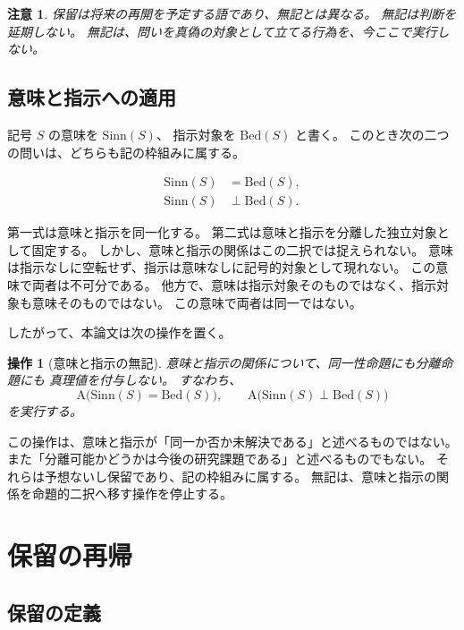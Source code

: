 \documentclass[11pt,a4paper,ja=standard,lualatex]{bxjsarticle}
\newtheorem{remark}{注意}
\newtheorem{operation}{操作}
\begin{document}
\begin{remark}
保留は将来の再開を予定する語であり、無記とは異なる。
無記は判断を延期しない。
無記は、問いを真偽の対象として立てる行為を、今ここで実行しない。
\end{remark}

\subsection{意味と指示への適用}

記号 $S$ の意味を $\mathrm{Sinn}(S)$、
指示対象を $\mathrm{Bed}(S)$ と書く。
このとき次の二つの問いは、どちらも記の枠組みに属する。

\begin{align}
\mathrm{Sinn}(S) &= \mathrm{Bed}(S),\\
\mathrm{Sinn}(S) &\perp \mathrm{Bed}(S).
\end{align}

第一式は意味と指示を同一化する。
第二式は意味と指示を分離した独立対象として固定する。
しかし、意味と指示の関係はこの二択では捉えられない。
意味は指示なしに空転せず、指示は意味なしに記号的対象として現れない。
この意味で両者は不可分である。
他方で、意味は指示対象そのものではなく、指示対象も意味そのものではない。
この意味で両者は同一ではない。

したがって、本論文は次の操作を置く。

\begin{operation}[意味と指示の無記]
意味と指示の関係について、同一性命題にも分離命題にも
真理値を付与しない。
すなわち、
\begin{equation}
\mathrm{A}\bigl(\mathrm{Sinn}(S)=\mathrm{Bed}(S)\bigr),
\qquad
\mathrm{A}\bigl(\mathrm{Sinn}(S)\perp\mathrm{Bed}(S)\bigr)
\end{equation}
を実行する。
\end{operation}

この操作は、意味と指示が「同一か否か未解決である」と述べるものではない。
また「分離可能かどうかは今後の研究課題である」と述べるものでもない。
それらは予想ないし保留であり、記の枠組みに属する。
無記は、意味と指示の関係を命題的二択へ移す操作を停止する。

\section{保留の再帰}

\subsection{保留の定義}
\end{document}
